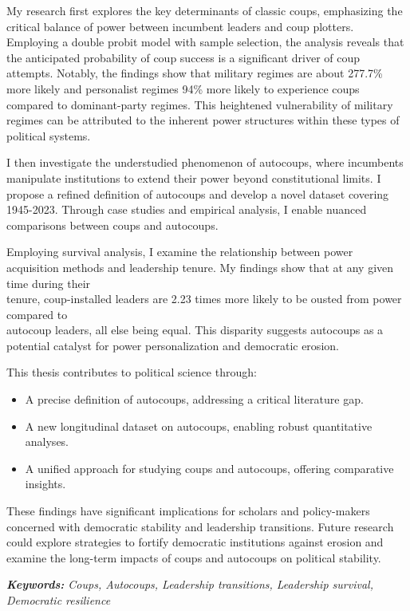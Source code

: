 \documentclass[
  12pt,
]{report}
\begin{document}
My research first explores the key determinants of classic coups,
emphasizing the critical balance of power between incumbent leaders and
coup plotters. Employing a double probit model with sample selection,
the analysis reveals that the anticipated probability of coup success is
a significant driver of coup attempts. Notably, the findings show that
military regimes are about 277.7\% more likely and personalist regimes
94\% more likely to experience coups compared to dominant-party regimes.
This heightened vulnerability of military regimes can be attributed to
the inherent power structures within these types of political systems.

I then investigate the understudied phenomenon of autocoups, where
incumbents manipulate institutions to extend their power beyond
constitutional limits. I propose a refined definition of autocoups and
develop a novel dataset covering 1945-2023. Through case studies and
empirical analysis, I enable nuanced comparisons between coups and
autocoups.

Employing survival analysis, I examine the relationship between power
acquisition methods and leadership tenure. My findings show that at any
given time during their\\
tenure, coup-installed leaders are 2.23 times more likely to be ousted
from power compared to\\
autocoup leaders, all else being equal. This disparity suggests
autocoups as a potential catalyst for power personalization and
democratic erosion.

This thesis contributes to political science through:

\begin{itemize}
\item
  A precise definition of autocoups, addressing a critical literature
  gap.
\item
  A new longitudinal dataset on autocoups, enabling robust quantitative
  analyses.
\item
  A unified approach for studying coups and autocoups, offering
  comparative insights.
\end{itemize}

These findings have significant implications for scholars and
policy-makers concerned with democratic stability and leadership
transitions. Future research could explore strategies to fortify
democratic institutions against erosion and examine the long-term
impacts of coups and autocoups on political stability.

\emph{\textbf{Keywords:} Coups, Autocoups, Leadership transitions,
Leadership survival, Democratic resilience}
\end{document}
